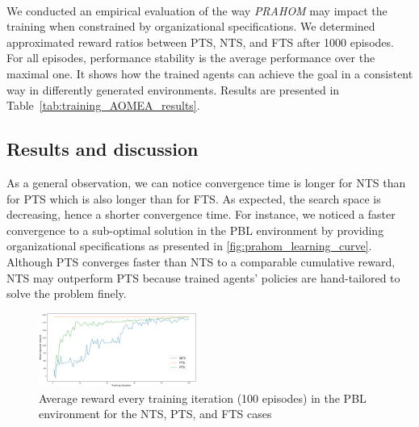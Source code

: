 \documentclass[runningheads]{llncs}
\begin{document}
\

We conducted an empirical evaluation of the way \emph{PRAHOM} may impact the training when constrained by organizational specifications. We determined approximated reward ratios between PTS, NTS, and FTS after 1000 episodes. For all episodes, performance stability is the average performance over the maximal one. It shows how the trained agents can achieve the goal in a consistent way in differently generated environments. Results are presented in Table~\ref{tab:training_AOMEA_results}.

\subsection{Results and discussion}




As a general observation, we can notice convergence time is longer for NTS than for PTS which is also longer than for FTS. As expected, the search space is decreasing, hence a shorter convergence time. For instance, we noticed a faster convergence to a sub-optimal solution in the PBL environment by providing organizational specifications as presented in \autoref{fig:prahom_learning_curve}. Although PTS converges faster than NTS to a comparable cumulative reward, NTS may outperform PTS because trained agents' policies are hand-tailored to solve the problem finely.
%
%
% 
%
%
%
\begin{figure}[h!]
    \centering
    \includegraphics[width=0.46\textwidth]{figures/prahom_learning_curve.png}
    \caption{Average reward every training iteration (100 episodes) in the PBL environment for the NTS, PTS, and FTS cases\\ \phantom{X} \\}
    \label{fig:prahom_learning_curve}
\end{figure}
\end{document}
